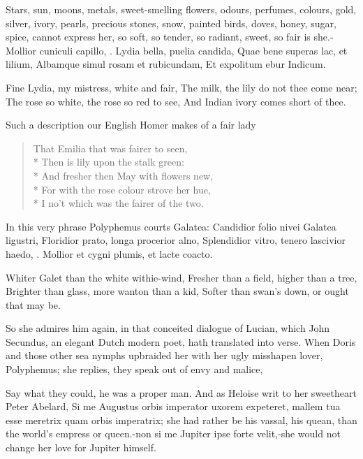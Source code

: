 {Stars, sun, moons, metals, sweet-smelling flowers, odours, perfumes,
colours, gold, silver, ivory, pearls, precious stones, snow, painted
birds, doves, honey, sugar, spice, cannot express her, so soft,
so tender, so radiant, sweet, so fair is she.-Mollior cuniculi capillo,
\etc{}.
Lydia bella, puelia candida,
Quae bene superas lac, et lilium,
Albamque simul rosam et rubicundam,
Et expolitum ebur Indicum.

Fine Lydia, my mistress, white and fair,
The milk, the lily do not thee come near;
The rose so white, the rose so red to see,
And Indian ivory comes short of thee.

Such a description our English Homer makes of a fair lady
%
{\gothfont
\begin{verse}
That Emilia that was fairer to seen,\\*
Then is lily upon the stalk green:\\*
And fresher then May with flowers new,\\*
For with the rose colour strove her hue,\\*
I no't which was the fairer of the two.
\end{verse}
}

In this very phrase Polyphemus courts Galatea:
Candidior folio nivei Galatea ligustri,
Floridior prato, longa procerior alno,
Splendidior vitro, tenero lascivior haedo, \etc{}.
Mollior et cygni plumis, et lacte coacto.

Whiter Galet than the white withie-wind,
Fresher than a field, higher than a tree,
Brighter than glass, more wanton than a kid,
Softer than swan's down, or ought that may be.

So she admires him again, in that conceited dialogue of Lucian, which
John Secundus, an elegant Dutch modern poet, hath translated into
verse. When Doris and those other sea nymphs upbraided her with her
ugly misshapen lover, Polyphemus; she replies, they speak out of envy
and malice,

Say what they could, he was a proper man. And as Heloise writ to her
sweetheart Peter Abelard, Si me Augustus orbis imperator uxorem
expeteret, mallem tua esse meretrix quam orbis imperatrix; she had
rather be his vassal, his quean, than the world's empress or queen.-non
si me Jupiter ipse forte velit,-she would not change her love for
Jupiter himself.

}
